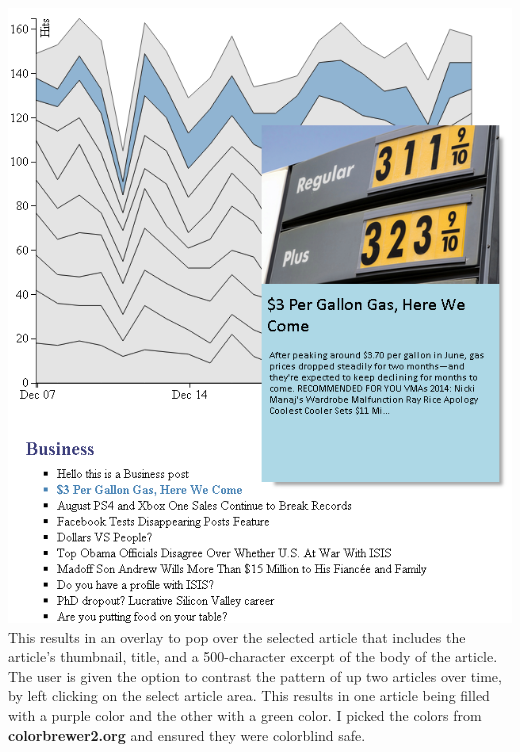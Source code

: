 \documentclass[12pt]{article}
\begin{document}
{\noindent\includegraphics[scale=0.7]{img/viz_2} \\

This results in an overlay to pop over the selected article that includes the article's thumbnail, title, and a 500-character excerpt of the body of the article. The user is given the option to contrast the pattern of up two articles over time, by left clicking on the select article area. This results in one article being filled with a purple color and the other with a green color. I picked the colors from \textbf{colorbrewer2.org} and ensured they were colorblind safe. \\

}
\end{document}
